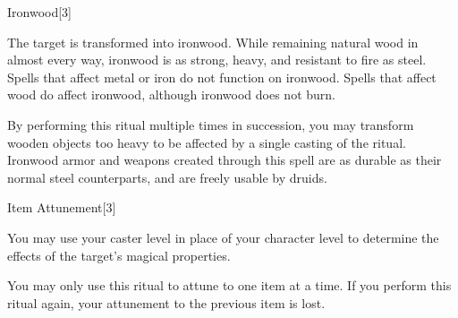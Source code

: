 \begin{spellsection}{Ironwood}[3]
    \begin{spellheader}
    \end{spellheader}
    \begin{spellcontent}
        \begin{spelltargetinginfo}
        \end{spelltargetinginfo}
        \begin{spelleffects}

            \spelleffect The target is transformed into ironwood. While remaining natural wood in almost every way, ironwood is as strong, heavy, and resistant to fire as steel. Spells that affect metal or iron do not function on ironwood. Spells that affect wood do affect ironwood, although ironwood does not burn.
        \end{spelleffects}
    \end{spellcontent}
    \begin{spellfooter}
        \spellnotes By performing this ritual multiple times in succession, you may transform wooden objects too heavy to be affected by a single casting of the ritual. Ironwood armor and weapons created through this spell are as durable as their normal steel counterparts, and are freely usable by druids.
    \end{spellfooter}
\end{spellsection}

\begin{spellsection}{Item Attunement}[3]
    \begin{spellheader}
    \end{spellheader}
    \begin{spellcontent}
        \begin{spelltargetinginfo}
        \end{spelltargetinginfo}
        \begin{spelleffects}

            \spelleffect You may use your caster level in place of your character level to determine the effects of the target's magical properties.
        \end{spelleffects}
    \end{spellcontent}
    \begin{spellfooter}
        \spellnotes You may only use this ritual to attune to one item at a time. If you perform this ritual again, your attunement to the previous item is lost.
    \end{spellfooter}
\end{spellsection}

